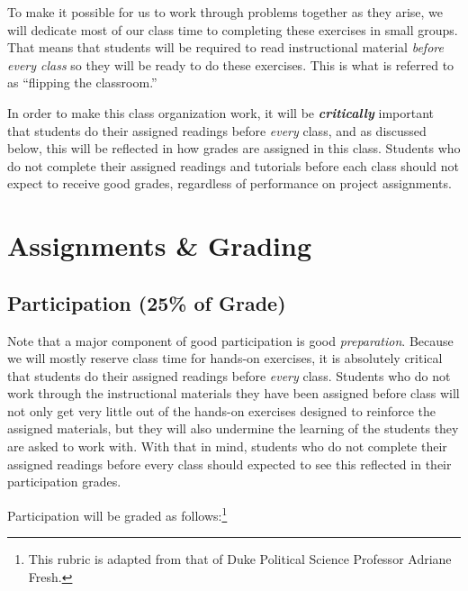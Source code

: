 \documentclass[12pt]{article}
\begin{document}
To make it possible for us to work through problems together as they arise, we will dedicate most of our class time to completing these exercises in small groups. That means that students will be required to read instructional material \emph{before every class} so they will be ready to do these exercises. This is what is referred to as ``flipping the classroom.''

In order to make this class organization work, it will be \textbf{\emph{critically}} important that students do their assigned readings before \emph{every} class, and as discussed below, this will be reflected in how grades are assigned in this class. Students who do not complete their assigned readings and tutorials before each class should not expect to receive good grades, regardless of performance on project assignments.






\section{Assignments \& Grading}

\subsection{Participation (25\% of Grade)}

Note that a major component of good participation is good \emph{preparation}. Because we will mostly reserve class time for hands-on exercises, it is absolutely critical that students do their assigned readings before \emph{every} class. Students who do not work through the instructional materials they have been assigned before class will not only get very little out of the hands-on exercises designed to reinforce the assigned materials, but they will also undermine the learning of the students they are asked to work with. With that in mind, students who do not complete their assigned readings before every class should expected to see this reflected in their participation grades.

Participation will be graded as follows:\footnote{This rubric is adapted from that of Duke Political Science Professor Adriane Fresh.}
\end{document}
